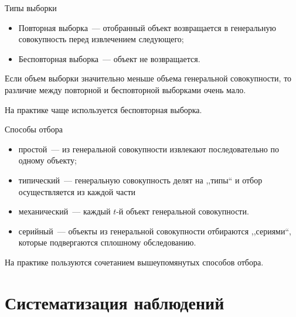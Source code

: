 \documentclass[unicode,11pt,notheorems,xcolor=table]{beamer}
\begin{document}
\begin{frame}{Типы выборки}{}

    \begin{itemize}
        \item \alert{Повторная выборка}~--- отобранный объект возвращается в генеральную совокупность перед извлечением следующего;
        \item \alert{Бесповторная выборка}~---  объект не возвращается. 
        
    \end{itemize}        

    \bigskip
    Если объем выборки значительно меньше объема генеральной совокупности, то различие между повторной и бесповторной выборками очень мало.

    \bigskip

    \alert{На практике чаще используется бесповторная выборка.}
\end{frame}

\begin{frame}{Способы отбора}{}
    \begin{itemize}
        \item \alert{простой}~--- из генеральной совокупности извлекают последовательно по одному объекту; 
        \item \alert{типический}~--- генеральную совокупность делят на ,,типы`` и отбор осуществляется из каждой части 
        \item \alert{механический}~--- каждый $t$-й объект генеральной совокупности.
        \item \alert{серийный}~--- объекты из генеральной совокупности отбираются ,,сериями``, которые подвергаются сплошному обследованию.
    \end{itemize}
    
    \bigskip
    На практике пользуются сочетанием вышеупомянутых способов отбора.
\end{frame}

\section{Систематизация наблюдений}
\end{document}
